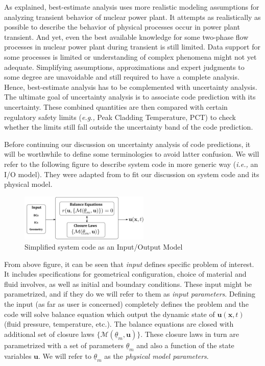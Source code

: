 \documentclass[11pt,titlepage]{article}
\begin{document}
As explained, best-estimate analysis uses more realistic modeling assumptions for analyzing transient behavior of nuclear power plant.
It attempts as realistically as possible to describe the behavior of physical processes occur in power plant transient.
And yet, even the best available knowledge for some two-phase flow processes in nuclear power plant during transient is still limited.
Data support for some processes is limited or understanding of complex phenomena might not yet adequate.
Simplifying assumptions, approximations and expert judgments to some degree are unavoidable and still required to have a complete analysis. 
Hence, best-estimate analysis has to be complemented with uncertainty analysis.
The ultimate goal of uncertainty analysis is to associate code prediction with its uncertainty. 
These combined quantities are then compared with certain regulatory safety limits (\textit{e.g.,} Peak Cladding Temperature, PCT) to check whether the limits still fall outside the uncertainty band of the code prediction.

Before continuing our discussion on uncertainty analysis of code predictions, it will be worthwhile to define some terminologies to avoid latter confusion.
We will refer to the following figure to describe system code in more generic way (\emph{i.e.,} an I/O model).
They were adapted from \cite{Cheung2011} to fit our discussion on system code and its physical model.
\begin{figure}[htbp]
	\centering
	\includegraphics[width=0.55\textwidth]{Model.pdf}
	\caption{Simplified system code as an Input/Output Model}
	\label{fig:Model}
\end{figure}

From above figure, it can be seen that \emph{input} defines specific problem of interest.
It includes specifications for geometrical configuration, choice of material and fluid involves, as well as initial and boundary conditions.
These input might be parametrized, and if they do we will refer to them as \emph{input parameters}. 
Defining the input (as far as user is concerned) completely defines the problem and the code will solve balance equation which output the dynamic state of $\mathbf{u}(\mathbf{x}, t)$ (fluid pressure, temperature, etc.). 
The balance equations are closed with additional set of closure laws $\{\mathcal{M}(\underline{\theta}_m, \mathbf{u})\}$.
These closure laws in turn are parametrized with a set of parameters $\underline{\theta}_m$ and also a function of the state variables $\mathbf{u}$. 
We will refer to $\underline{\theta}_m$ as the \emph{physical model parameters}.
\end{document}
